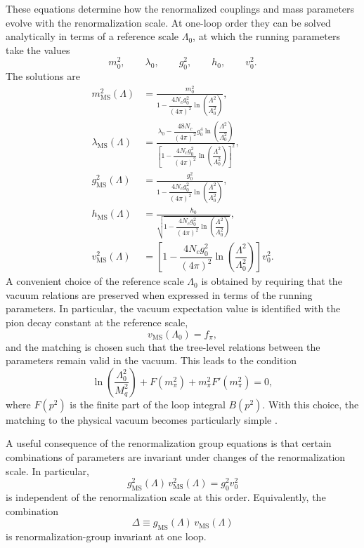 These equations determine how the renormalized couplings and mass
parameters evolve with the renormalization scale. At one-loop order
they can be solved analytically in terms of a reference scale
\(\Lambda_0\), at which the running parameters take the values
\[
m_0^2,\qquad \lambda_0,\qquad g_0^2,\qquad h_0,\qquad v_0^2 .
\]
The solutions are
\begin{align}
m^2_{\mathrm{MS}}(\Lambda)
&=
\frac{m_0^2}{
1-\dfrac{4N_c g_0^2}{(4\pi)^2}
\ln\!\left(\dfrac{\Lambda^2}{\Lambda_0^2}\right)}, \\
\lambda_{\mathrm{MS}}(\Lambda)
&=
\frac{
\lambda_0
-
\dfrac{48N_c}{(4\pi)^2}g_0^4
\ln\!\left(\dfrac{\Lambda^2}{\Lambda_0^2}\right)
}{
\left[
1-\dfrac{4N_c g_0^2}{(4\pi)^2}
\ln\!\left(\dfrac{\Lambda^2}{\Lambda_0^2}\right)
\right]^2
}, \\
g^2_{\mathrm{MS}}(\Lambda)
&=
\frac{g_0^2}{
1-\dfrac{4N_c g_0^2}{(4\pi)^2}
\ln\!\left(\dfrac{\Lambda^2}{\Lambda_0^2}\right)}, \\
h_{\mathrm{MS}}(\Lambda)
&=
\frac{h_0}{
\sqrt{
1-\dfrac{4N_c g_0^2}{(4\pi)^2}
\ln\!\left(\dfrac{\Lambda^2}{\Lambda_0^2}\right)
}}, \\
v^2_{\mathrm{MS}}(\Lambda)
&=
\left[
1-\dfrac{4N_c g_0^2}{(4\pi)^2}
\ln\!\left(\dfrac{\Lambda^2}{\Lambda_0^2}\right)
\right] v_0^2 .
\end{align}
A convenient choice of the reference scale \(\Lambda_0\) is obtained
by requiring that the vacuum relations are preserved when expressed in
terms of the running parameters. In particular, the vacuum expectation
value is identified with the pion decay constant at the reference scale,
\begin{equation}
v_{\mathrm{MS}}(\Lambda_0) = f_\pi ,
\end{equation}
and the matching is chosen such that the tree-level relations between
the parameters remain valid in the vacuum. This leads to the condition
\begin{equation}
\ln\!\left(\frac{\Lambda_0^2}{M_q^2}\right)
+
F(m_\pi^2)
+
m_\pi^2 F'(m_\pi^2)
=0,
\label{eq:qm_lambda0_condition}
\end{equation}
where \(F(p^2)\) is the finite part of the loop integral \(B(p^2)\).
With this choice, the matching to the physical vacuum becomes
particularly simple \cite{Folkestad2018,Andersen2024}.

A useful consequence of the renormalization group equations is that
certain combinations of parameters are invariant under changes of the
renormalization scale. In particular,
\begin{equation}
g^2_{\mathrm{MS}}(\Lambda)\,v^2_{\mathrm{MS}}(\Lambda)
=
g_0^2 v_0^2
\end{equation}
is independent of the renormalization scale at this order. Equivalently,
the combination
\begin{equation}
\Delta \equiv g_{\mathrm{MS}}(\Lambda)\,v_{\mathrm{MS}}(\Lambda)
\end{equation}
is renormalization-group invariant at one loop.

